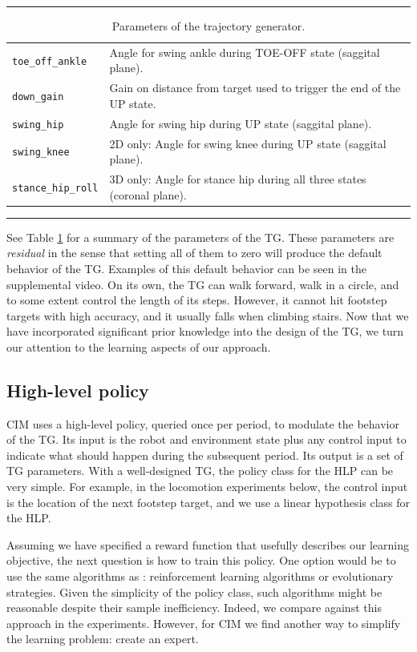 \documentclass[conference]{IEEEtran}
\begin{document}
\begin{table}
  \normalsize
  \caption{Parameters of the trajectory generator.}
  \label{table:params}
  \hrule
  \begin{tabular}{ll}
    \texttt{toe\_off\_ankle} & Angle for swing ankle during TOE-OFF state (saggital plane). \\
    \texttt{down\_gain} & Gain on distance from target used to trigger the end of the UP state. \\
    \texttt{swing\_hip} & Angle for swing hip during UP state (saggital plane). \\
    \texttt{swing\_knee} & 2D only: Angle for swing knee during UP state (saggital plane). \\
    \texttt{stance\_hip\_roll} & 3D only: Angle for stance hip during all three states (coronal plane). \\
  \end{tabular}
  \hrule
\end{table}

See Table \ref{table:params} for a summary of the parameters of the TG.
These parameters are \emph{residual} in the sense that setting all of them to zero will produce the default behavior of the TG.
Examples of this default behavior can be seen in the supplemental video.
On its own, the TG can walk forward, walk in a circle, and to some extent control the length of its steps.
However, it cannot hit footstep targets with high accuracy, and it usually falls when climbing stairs.
Now that we have incorporated significant prior knowledge into the design of the TG, we turn our attention to the learning aspects of our approach.

\subsection{High-level policy}

CIM uses a high-level policy, queried once per period, to modulate the behavior of the TG.
Its input is the robot and environment state plus any control input to indicate what should happen during the subsequent period.
Its output is a set of TG parameters.
With a well-designed TG, the policy class for the HLP can be very simple.
For example, in the locomotion experiments below, the control input is the location of the next footstep target,
and we use a linear hypothesis class for the HLP.

Assuming we have specified a reward function that usefully describes our learning objective, the next question is how to train this policy.
One option would be to use the same algorithms as \citet{iscen2018pmtg}: reinforcement learning algorithms or evolutionary strategies.
Given the simplicity of the policy class, such algorithms might be reasonable despite their sample inefficiency.
Indeed, we compare against this approach in the experiments.
However, for CIM we find another way to simplify the learning problem: create an expert.
\end{document}
